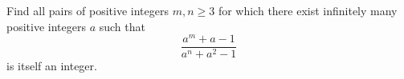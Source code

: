Find all pairs of positive integers $m, n \geq 3$ for which there exist infinitely many positive integers $a$ such that
\[ \frac{a^m + a - 1}{a^n + a^2 - 1} \]
is itself an integer.
